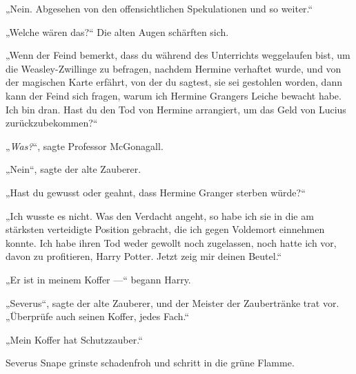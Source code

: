 „Nein. Abgesehen von den offensichtlichen Spekulationen und so weiter.“

„Welche wären das?“ Die alten Augen schärften sich.

„Wenn der Feind bemerkt, dass du während des Unterrichts weggelaufen bist, um die Weasley-Zwillinge zu befragen, nachdem Hermine verhaftet wurde, und von der magischen Karte erfährt, von der du sagtest, sie sei gestohlen worden, dann kann der Feind sich fragen, warum ich Hermine Grangers Leiche bewacht habe. Ich bin dran. Hast du den Tod von Hermine arrangiert, um das Geld von Lucius zurückzubekommen?“

„\emph{Was?}“, sagte Professor McGonagall.

„Nein“, sagte der alte Zauberer.

„Hast du gewusst oder geahnt, dass Hermine Granger sterben würde?“

„Ich wusste es nicht. Was den Verdacht angeht, so habe ich sie in die am stärksten verteidigte Position gebracht, die ich gegen Voldemort einnehmen konnte. Ich habe ihren Tod weder gewollt noch zugelassen, noch hatte ich vor, davon zu profitieren, Harry Potter. Jetzt zeig mir deinen Beutel.“

„Er ist in meinem Koffer —“ begann Harry.

„Severus“, sagte der alte Zauberer, und der Meister der Zaubertränke trat vor. „Überprüfe auch seinen Koffer, jedes Fach.“

„Mein Koffer hat Schutzzauber.“

Severus Snape grinste schadenfroh und schritt in die grüne Flamme.

